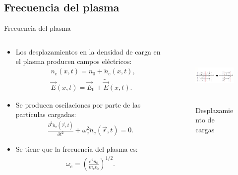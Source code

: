 \documentclass[11pt]{beamer}
\begin{document}
    \subsection{Frecuencia del plasma}
        \begin{frame}{Frecuencia del plasma}
        \fontsize{8pt}{10}\selectfont        \begin{columns}
        \begin{column}{0.4\textwidth}
        \begin{block}{}        
        \begin{itemize}
        \item Los desplazamientos en la densidad de carga en el plasma producen campos eléctricos:
        \begin{align*}
        &n_e(x,t) = n_0 + \tilde{n}_e(x,t),\\
        &\vec E(x,t) = \vec E_0 + \tilde{\vec E}(x,t).
        \end{align*}
        \item Se producen oscilaciones por parte de las partículas cargadas:
        \begin{align*}
        \frac{\partial^2 \tilde{n}_e(\vec{r},t)}{\partial t^2} + \omega_e^{2} \tilde{n}_e(\vec{r},t) = 0.
        \end{align*}
        \item Se tiene que la frecuencia del plasma es:
        \begin{align*}
        \omega_e = \left( \frac{e^2n_0}{m_e\epsilon_0} \right)^{1/2}.
        \end{align*}
        \end{itemize}
        \end{block}
        \end{column}
        
        \begin{column}{0.4\textwidth}
        \begin{figure}
            \centering
            \includegraphics[width=5cm,height=3cm]{frecuencia_plasmas.jpg}
            \caption{Desplazamiento de cargas}
            \label{fig:imag2}
        \end{figure}
        \end{column}
        \end{columns}
        
        \end{frame}
        
\end{document}
